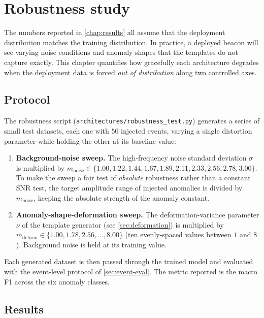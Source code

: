 \chapter{Robustness study}
\label{chap:robustness}

The numbers reported in \cref{chap:results} all assume that the
deployment distribution matches the training distribution. In
practice, a deployed beacon will see varying noise conditions and
anomaly shapes that the templates do not capture exactly. This chapter
quantifies how gracefully each architecture degrades when the
deployment data is forced \emph{out of distribution} along two
controlled axes.

\section{Protocol}
\label{sec:rob-protocol}

The robustness script
(\texttt{architectures/robustness\_test.py}) generates a series of
small test datasets, each one with $50$ injected events, varying a
single distortion parameter while holding the other at its baseline
value:

\begin{enumerate}[leftmargin=*, itemsep=0.2em]
    \item \textbf{Background-noise sweep.} The high-frequency
    noise standard deviation $\sigma$ is multiplied by
    $m_{\text{noise}} \in \{1.00, 1.22, 1.44, 1.67, 1.89, 2.11, 2.33,
    2.56, 2.78, 3.00\}$. To make the sweep a fair test of
    \emph{absolute} robustness rather than a constant SNR test, the
    target amplitude range of injected anomalies is divided by
    $m_{\text{noise}}$, keeping the absolute strength of the anomaly
    constant.
    \item \textbf{Anomaly-shape-deformation sweep.} The
    deformation-variance parameter $\nu$ of the template generator
    (see \cref{sec:deformation}) is multiplied by
    $m_{\text{deform}} \in \{1.00, 1.78, 2.56, \dots, 8.00\}$ (ten
    evenly-spaced values between $1$ and $8$). Background noise is held
    at its training value.
\end{enumerate}

Each generated dataset is then passed through the trained model and
evaluated with the event-level protocol of \cref{sec:event-eval}. The
metric reported is the macro F1 across the six anomaly classes.

\section{Results}
\label{sec:rob-results}

